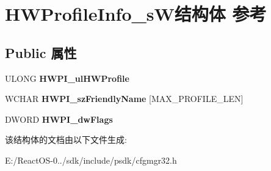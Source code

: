 \hypertarget{struct_h_w_profile_info__s_w}{}\section{H\+W\+Profile\+Info\+\_\+s\+W结构体 参考}
\label{struct_h_w_profile_info__s_w}
\subsection*{Public 属性}
\begin{DoxyCompactItemize}
\item 
\mbox{\label{struct_h_w_profile_info__s_w_a023bd70c5ae426f5e9e5cdab6568d54c}} 
U\+L\+O\+NG {\bfseries H\+W\+P\+I\+\_\+ul\+H\+W\+Profile}
\item 
\mbox{\label{struct_h_w_profile_info__s_w_aa0204ebc7e9b50f8e237b252562cb94a}} 
W\+C\+H\+AR {\bfseries H\+W\+P\+I\+\_\+sz\+Friendly\+Name} \mbox{[}M\+A\+X\+\_\+\+P\+R\+O\+F\+I\+L\+E\+\_\+\+L\+EN\mbox{]}
\item 
\mbox{\label{struct_h_w_profile_info__s_w_a5e813c255d6b7fe0465100a40353cd21}} 
D\+W\+O\+RD {\bfseries H\+W\+P\+I\+\_\+dw\+Flags}
\end{DoxyCompactItemize}


该结构体的文档由以下文件生成\+:\begin{DoxyCompactItemize}
\item 
E\+:/\+React\+O\+S-\/0../sdk/include/psdk/cfgmgr32.\+h\end{DoxyCompactItemize}
